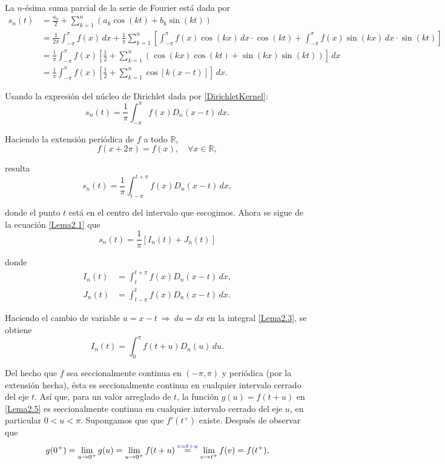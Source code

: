 \begin{demo}
La $n$-ésima suma parcial de la serie de Fourier está dada por
\begin{align*}
    s_n(t) &= \frac{a_0}{2} + \sum_{k=1}^n (a_k \cos(kt) + b_k \sin(kt)) \\
    &= \frac{1}{2\pi} \int_{-\pi}^{\pi} f(x) \,dx + \frac{1}{\pi} \sum_{k=1}^n \left[ \int_{-\pi}^{\pi} f(x) \cos(k x) \,dx \cdot \cos(kt) + \int_{-\pi}^{\pi} f(x) \sin(k x) \,dx \cdot \sin(kt)\right] \\
    &= \frac{1}{\pi} \int_{-\pi}^{\pi} f(x) \left[\frac{1}{2} + \sum_{k=1}^n (\cos(kx) \cos(kt) + \sin(kx) \sin(kt)) \right] \,dx \\
    &= \frac{1}{\pi} \int_{-\pi}^{\pi} f(x) \left[ \frac{1}{2} + \sum_{k=1}^n \cos[k(x-t)] \right] \,dx.
\end{align*}

Usando la expresión del núcleo de Dirichlet dada por \eqref{DirichletKernel}:
$$s_n(t) = \frac{1}{\pi} \int_{-\pi}^{\pi} f(x) D_n(x-t) \,dx.$$

Haciendo la extensión periódica de $f$ a todo $\mathbb{R}$, 
$$f(x + 2\pi) = f(x), \quad \forall x \in \mathbb{R},$$

 resulta
 \begin{equation}
    s_n(t) = \frac{1}{\pi} \int_{t-\pi}^{t + \pi} f(x) D_n(x-t) \,dx,\label{Lema2.1}
 \end{equation}
 
donde el punto $t$ está en el centro del intervalo que escogimos. Ahora se sigue de la ecuación  \eqref{Lema2.1} que
\begin{equation}
  s_n(t) = \frac{1}{\pi} [I_n(t) + J_n(t)] \label{Lema2.2} 
\end{equation}

donde  
\begin{align}
    I_n(t) &= \int_{t}^{t+\pi} f(x) D_n(x-t) \,dx, \label{Lema2.3} \\
    J_n(t) &= \int_{t-\pi}^t f(x) D_n(x-t) \,dx. \label{Lema2.4} 
\end{align}

Haciendo el cambio de variable $u = x-t ~\Rightarrow~ du = dx $ en la integral \eqref{Lema2.3}, se obtiene
\begin{equation}
    I_n(t) = \int_{0}^{\pi} f(t+u) D_n(u) \,du.\label{Lema2.5} 
\end{equation}

Del hecho que $f$ sea seccionalmente continua en $(-\pi,\pi)$ y periódica (por la extensión hecha), ésta es seccionalmente continua en cualquier intervalo cerrado del eje $t$. Así que, para un valor arreglado de $t$, la función $g(u) = f(t+u)$ en \eqref{Lema2.5} es seccionalmente continua en cualquier intervalo cerrado del eje $u$, en particular $0<u<\pi$. Supongamos que que $f'(t^+)$ existe. Después de observar que
$$g(0^+) = \lim_{u \to 0^+} g(u) = \lim_{u \to 0^+} f(t+u) \overset{\textcolor{blue}{v = t+u}}{=} \lim_{v \to t^+} f(v) = f(t^+),$$


\end{demo}

